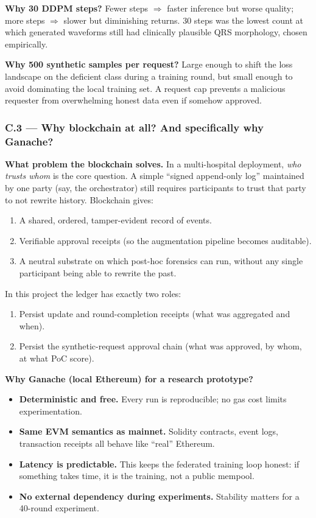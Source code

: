 \documentclass[11pt,a4paper]{article}
\begin{document}
\textbf{Why 30 DDPM steps?}
Fewer steps $\Rightarrow$ faster inference but worse quality;
more steps $\Rightarrow$ slower but diminishing returns.
30 steps was the lowest count at which generated waveforms still had
clinically plausible QRS morphology, chosen empirically.

\textbf{Why 500 synthetic samples per request?}
Large enough to shift the loss landscape on the deficient class
during a training round, but small enough to avoid dominating the
local training set. A request cap prevents a malicious requester
from overwhelming honest data even if somehow approved.

\subsubsection{C.3 --- Why blockchain at all? And specifically why Ganache?}

\textbf{What problem the blockchain solves.}
In a multi-hospital deployment, \emph{who trusts whom} is the core
question. A simple ``signed append-only log'' maintained by one party
(say, the orchestrator) still requires participants to trust that party
to not rewrite history. Blockchain gives:
\begin{enumerate}
\item A shared, ordered, tamper-evident record of events.
\item Verifiable approval receipts (so the augmentation pipeline becomes auditable).
\item A neutral substrate on which post-hoc forensics can run, without any single participant being able to rewrite the past.
\end{enumerate}

In this project the ledger has exactly two roles:
\begin{enumerate}
\item Persist update and round-completion receipts (what was aggregated and when).
\item Persist the synthetic-request approval chain (what was approved, by whom, at what PoC score).
\end{enumerate}

\textbf{Why Ganache (local Ethereum) for a research prototype?}
\begin{itemize}
\item \textbf{Deterministic and free.} Every run is reproducible; no gas cost limits experimentation.
\item \textbf{Same EVM semantics as mainnet.} Solidity contracts, event logs, transaction receipts all behave like ``real'' Ethereum.
\item \textbf{Latency is predictable.} This keeps the federated training loop honest: if something takes time, it is the training, not a public mempool.
\item \textbf{No external dependency during experiments.} Stability matters for a 40-round experiment.
\end{itemize}
\end{document}
